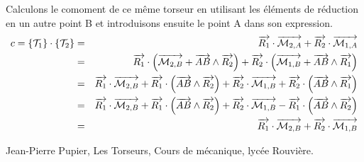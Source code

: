 \documentclass[10pt,oneside]{article}
\begin{document}
\begin{demo}
Calculons le comoment de ce même torseur en utilisant les éléments de réduction en un autre point B et introduisons ensuite le point A dans son expression.
\begin{eqnarray*}
c=\left\{{\mathcal{T}_1}\right\} \cdot \left\{{\mathcal{T}_2}\right\}&=&
\overrightarrow{R_1}\cdot \overrightarrow{\mathcal{M}_{2,A}}+\overrightarrow{R_2}\cdot \overrightarrow{\mathcal{M}_{1,A}} \\
&=& 
\overrightarrow{R_1}\cdot\left(\overrightarrow{\mathcal{M}_{2,B}}+\overrightarrow{AB}\wedge \overrightarrow{R_2} \right) + \overrightarrow{R_2}\cdot\left(\overrightarrow{\mathcal{M}_{1,B}}+\overrightarrow{AB}\wedge \overrightarrow{R_1} \right) \\
&=&
\overrightarrow{R_1}\cdot\overrightarrow{\mathcal{M}_{2,B}} + \overrightarrow{R_1}\cdot \left(\overrightarrow{AB}\wedge \overrightarrow{R_2} \right) + 
\overrightarrow{R_2}\cdot\overrightarrow{\mathcal{M}_{1,B}} + \overrightarrow{R_2}\cdot\left(\overrightarrow{AB}\wedge \overrightarrow{R_1} \right) \\
&=&
\overrightarrow{R_1}\cdot\overrightarrow{\mathcal{M}_{2,B}} + \overrightarrow{R_1}\cdot \left(\overrightarrow{AB}\wedge \overrightarrow{R_2} \right) + 
\overrightarrow{R_2}\cdot\overrightarrow{\mathcal{M}_{1,B}} - \overrightarrow{R_1}\cdot\left(\overrightarrow{AB}\wedge \overrightarrow{R_2} \right)  \\
&=&\overrightarrow{R_1}\cdot\overrightarrow{\mathcal{M}_{2,B}} + \overrightarrow{R_2}\cdot\overrightarrow{\mathcal{M}_{1,B}}
\end{eqnarray*}
\end{demo}
\begin{thebibliography}{2}
 Jean-Pierre Pupier, Les Torseurs, Cours de mécanique, lycée Rouvière.
\end{thebibliography}
\end{document}
